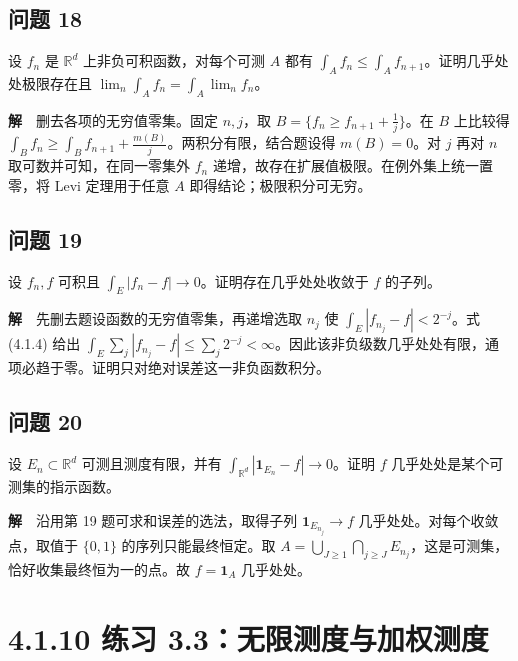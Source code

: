 \documentclass[11pt,a4paper]{article}
\begin{document}
\subsection{问题 18}\label{ux95eeux9898-18}

设 \(f_n\) 是 \(\mathbb R^d\) 上非负可积函数，对每个可测 \(A\) 都有
\(\int_A f_n\le\int_A f_{n+1}\)。证明几乎处处极限存在且
\(\lim_n\int_A f_n=\int_A\lim_n f_n\)。

\textbf{解}　删去各项的无穷值零集。固定 \(n,j\)，取
\(B=\{f_n\ge f_{n+1}+\frac1j\}\)。在 \(B\) 上比较得
\(\int_B f_n\ge\int_B f_{n+1}+\frac{m(B)}{j}\)。两积分有限，结合题设得
\(m(B)=0\)。对 \(j\) 再对 \(n\) 取可数并可知，在同一零集外 \(f_n\)
递增，故存在扩展值极限。在例外集上统一置零，将 Levi 定理用于任意 \(A\)
即得结论；极限积分可无穷。

\subsection{问题 19}\label{ux95eeux9898-19}

设 \(f_n,f\) 可积且 \(\int_E|f_n-f|\to0\)。证明存在几乎处处收敛于 \(f\)
的子列。

\textbf{解}　先删去题设函数的无穷值零集，再递增选取 \(n_j\) 使
\(\int_E|f_{n_j}-f|<2^{-j}\)。式 (4.1.4) 给出
\(\int_E\sum_j|f_{n_j}-f|\le\sum_j2^{-j}<\infty\)。因此该非负级数几乎处处有限，通项必趋于零。证明只对绝对误差这一非负函数积分。

\subsection{问题 20}\label{ux95eeux9898-20}

设 \(E_n\subset\mathbb R^d\) 可测且测度有限，并有
\(\int_{\mathbb R^d}|\mathbf1_{E_n}-f|\to0\)。证明 \(f\)
几乎处处是某个可测集的指示函数。

\textbf{解}　沿用第 19 题可求和误差的选法，取得子列
\(\mathbf1_{E_{n_j}}\to f\) 几乎处处。对每个收敛点，取值于 \(\{0,1\}\)
的序列只能最终恒定。取
\(A=\bigcup_{J\ge1}\bigcap_{j\ge J}E_{n_j}\)，这是可测集，恰好收集最终恒为一的点。故
\(f=\mathbf1_A\) 几乎处处。

\clearpage\section[\S{}4.1.10 练习
3.3：无限测度与加权测度]{4.1.10 练习
3.3：无限测度与加权测度}\label{ux7ec3ux4e60-3.3ux65e0ux9650ux6d4bux5ea6ux4e0eux52a0ux6743ux6d4bux5ea6}
\end{document}
